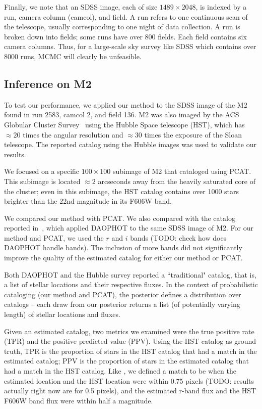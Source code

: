 Finally, we note that an SDSS image, each of size $1489 \times 2048$, is indexed by a run, camera column (camcol), and field. A run refers to one continuous scan of the telescope, usually corresponding to one night of data collection. A run is broken down 
into fields; some runs have over 800 fields. Each field contains 
six camera columns. Thus, for a large-scale sky survey like SDSS which 
contains over 8000 runs, MCMC will clearly be unfeasible. 


\subsection{Inference on M2}
To test our performance, we applied our method to the SDSS image of the M2 found in run 2583, camcol 2, and field 136.
M2 was also imaged by the ACS Globular Cluster Survey~\cite{Sarajedini_2007}
using the Hubble Space telescope (HST),
which has $\approx20$ times the angular resolution and $\approx30$ times the exposure of the Sloan telescope. The reported catalog using the Hubble images was used to 
validate our results. 

We focused on a specific $100 \times 100$ subimage of M2 that \cite{Portillo_2017, Feder_2019} cataloged using PCAT.
This subimage is located $\approx2$ arcseconds away from the heavily saturated core of the cluster;
even in this subimage, the HST catalog contains over 1000 stars brighter than the 22nd magnitude in its F606W band.

We compared our method with PCAT. We also compared with the catalog reported in~\cite{An_2008_m2}, which applied DAOPHOT to the same SDSS image of M2. 
For our method and PCAT, we used the $r$ and $i$ bands (TODO: check how does DAOPHOT handle bands). The inclusion of more bands did not significantly improve the quality of the estimated catalog for either our method or PCAT. 

Both DAOPHOT and the Hubble survey reported a ``traditional" catalog, that is, a list of stellar locations and their respective fluxes. In the context of probabilistic cataloging (our method and PCAT), the posterior 
defines a distribution over catalogs -- each draw from our posterior returns a list (of potentially varying length) of stellar locations and fluxes. 

Given an estimated catalog, two metrics we examined were the true positive rate (TPR) and the positive predicted value (PPV). Using the HST catalog as ground truth, TPR is the proportion of stars in the HST catalog that had a match in the estimated catalog;
PPV is the proportion of stars in the estimated catalog that had a match in the HST catalog. Like \cite{Portillo_2017, Feder_2019}, we defined a match to be when the estimated location and the HST location were within 0.75 pixels
(TODO: results actually right now are for 0.5 pixels),
and the estimated r-band flux and the HST F606W band flux were within half a magnitude.

